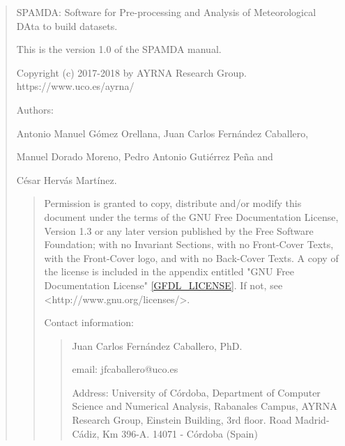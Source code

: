 

\thispagestyle{empty}

\small

\vspace*{\fill} %

\begin{quote}

	SPAMDA: Software for Pre-processing and Analysis of Meteorological DAta to build datasets.

	This is the version 1.0 of the SPAMDA manual.

	Copyright (c) 2017-2018 by AYRNA Research Group. https://www.uco.es/ayrna/

	\hspace{1.005cm}Authors:

	\hspace{1.30cm}Antonio Manuel Gómez Orellana, Juan Carlos Fernández Caballero,

	\hspace{1.30cm}Manuel Dorado Moreno, Pedro Antonio Gutiérrez Peña and 

	\hspace{1.30cm}César Hervás Martínez.

	\begin{quote} %
		Permission is granted to copy, distribute and/or modify this document 
		under the terms of the GNU Free Documentation License, Version 1.3 or any later
		version published by the Free Software Foundation; with no Invariant Sections, 
		with no Front-Cover Texts, with the Front-Cover logo, and with no Back-Cover Texts.
		\newline
		\newline
		A copy of the license is included in the appendix entitled "GNU Free Documentation License" \ref{GFDL_LICENSE}. If not, see <http://www.gnu.org/licenses/>.

		\vspace{0.50cm}
		Contact information:
	
		\begin{quote}
			Juan Carlos Fernández Caballero, PhD.

			email: jfcaballero@uco.es

			Address: University of Córdoba, Department of Computer Science and Numerical Analysis, Rabanales Campus, AYRNA Research Group, Einstein Building, 3rd floor. Road Madrid-Cádiz, Km 396-A. 14071 - Córdoba (Spain)
		\end{quote}

	\end{quote}

\end{quote}










